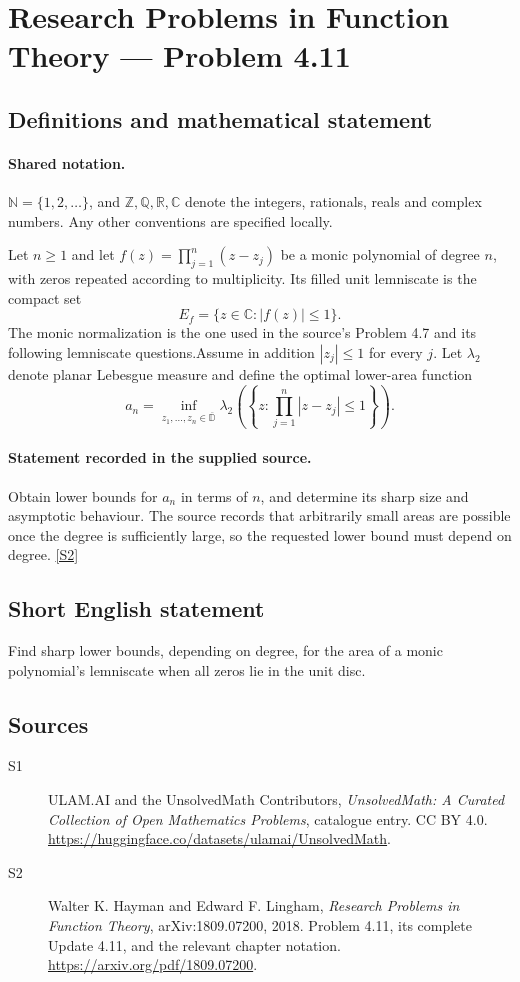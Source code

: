 \documentclass[11pt]{book}
\newcommand{\sref}[2]{\hyperlink{source:#1:#2}{[S#2]}}
\begin{document}
\section{Research Problems in Function Theory — Problem 4.11}\label{statement}

\subsection{Definitions and mathematical statement}

\paragraph{Shared notation.}$\mathbb N=\{1,2,\ldots\}$, and $\mathbb Z,\mathbb Q,\mathbb R,\mathbb C$ denote the integers, rationals, reals and complex numbers. Any other conventions are specified locally.


Let $n\ge1$ and let $f(z)=\prod_{j=1}^n(z-z_j)$ be a monic polynomial of degree $n$, with zeros repeated according to multiplicity. Its filled unit lemniscate is the compact set
\[E_f=\{z\in\mathbb C:|f(z)|\le1\}.
\]
The monic normalization is the one used in the source's Problem 4.7 and its following lemniscate questions.Assume in addition $|z_j|\le1$ for every $j$. Let $\lambda_2$ denote planar Lebesgue measure and define the optimal lower-area function
\[a_n=\inf_{z_1,\ldots,z_n\in\overline{\mathbb D}}\lambda_2\left(\left\{z:\prod_{j=1}^n|z-z_j|\le1\right\}\right).
\]
\paragraph{Statement recorded in the supplied source.}
Obtain lower bounds for $a_n$ in terms of $n$, and determine its sharp size and asymptotic behaviour. The source records that arbitrarily small areas are possible once the degree is sufficiently large, so the requested lower bound must depend on degree. \sref{statement}{2}
\subsection{Short English statement}
Find sharp lower bounds, depending on degree, for the area of a monic polynomial’s lemniscate when all zeros lie in the unit disc.
\subsection{Sources}
\begin{description}
\item[\hypertarget{source:statement:1}{S1}] ULAM.AI and the UnsolvedMath Contributors, \emph{UnsolvedMath: A Curated Collection of Open Mathematics Problems}, catalogue entry. CC BY 4.0. \url{https://huggingface.co/datasets/ulamai/UnsolvedMath}.
\item[\hypertarget{source:statement:2}{S2}] Walter K. Hayman and Edward F. Lingham, \emph{Research Problems in Function Theory}, arXiv:1809.07200, 2018. Problem 4.11, its complete Update 4.11, and the relevant chapter notation. \url{https://arxiv.org/pdf/1809.07200}.
\end{description}
\label{end:statement}
\end{document}
